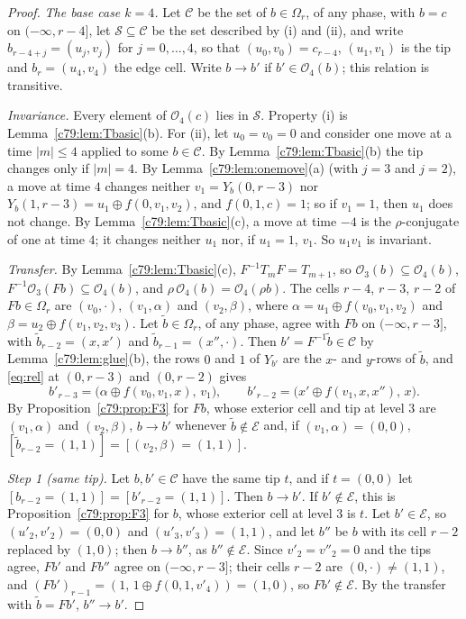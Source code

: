 \begin{proof}
\emph{The base case $k=4$.} Let $\mathcal C$ be the set of $b\in\Omega_r$, of any phase, with $b=c$ on $(-\infty,r-4]$, let $\mathcal S\subseteq\mathcal C$ be the set described by (i) and (ii), and write $b_{r-4+j}=(u_j,v_j)$ for $j=0,\dots,4$, so that $(u_0,v_0)=c_{r-4}$, $(u_1,v_1)$ is the tip and $b_r=(u_4,v_4)$ the edge cell. Write $b\to b'$ if $b'\in\mathcal O_4(b)$; this relation is transitive.

\emph{Invariance.} Every element of $\mathcal O_4(c)$ lies in $\mathcal S$. Property (i) is Lemma~\ref{c79:lem:Tbasic}(b). For (ii), let $u_0=v_0=0$ and consider one move at a time $|m|\le4$ applied to some $b\in\mathcal C$. By Lemma~\ref{c79:lem:Tbasic}(b) the tip changes only if $|m|=4$. By Lemma~\ref{c79:lem:onemove}(a) (with $j=3$ and $j=2$), a move at time $4$ changes neither $v_1=Y_b(0,r-3)$ nor $Y_b(1,r-3)=u_1\oplus f(0,v_1,v_2)$, and $f(0,1,c)=1$; so if $v_1=1$, then $u_1$ does not change. By Lemma~\ref{c79:lem:Tbasic}(c), a move at time $-4$ is the $\rho$-conjugate of one at time $4$; it changes neither $u_1$ nor, if $u_1=1$, $v_1$. So $u_1v_1$ is invariant.

\emph{Transfer.} By Lemma~\ref{c79:lem:Tbasic}(c), $F^{-1}T_mF=T_{m+1}$, so $\mathcal O_3(b)\subseteq\mathcal O_4(b)$, $F^{-1}\mathcal O_3(Fb)\subseteq\mathcal O_4(b)$, and $\rho\,\mathcal O_4(b)=\mathcal O_4(\rho b)$. The cells $r-4$, $r-3$, $r-2$ of $Fb\in\Omega_r$ are $(v_0,\cdot)$, $(v_1,\alpha)$ and $(v_2,\beta)$, where $\alpha=u_1\oplus f(v_0,v_1,v_2)$ and $\beta=u_2\oplus f(v_1,v_2,v_3)$. Let $\tilde b\in\Omega_r$, of any phase, agree with $Fb$ on $(-\infty,r-3]$, with $\tilde b_{r-2}=(x,x')$ and $\tilde b_{r-1}=(x'',\cdot)$. Then $b'=F^{-1}\tilde b\in\mathcal C$ by Lemma~\ref{c79:lem:glue}(b), the rows $0$ and $1$ of $Y_{b'}$ are the $x$- and $y$-rows of $\tilde b$, and \eqref{eq:rel} at $(0,r-3)$ and $(0,r-2)$ gives
\[
b'_{r-3}=\bigl(\alpha\oplus f(v_0,v_1,x),\,v_1\bigr),\qquad b'_{r-2}=\bigl(x'\oplus f(v_1,x,x''),\,x\bigr).
\]
By Proposition~\ref{c79:prop:F3} for $Fb$, whose exterior cell and tip at level $3$ are $(v_1,\alpha)$ and $(v_2,\beta)$, $b\to b'$ whenever $\tilde b\notin\mathcal E$ and, if $(v_1,\alpha)=(0,0)$, $[\tilde b_{r-2}=(1,1)]=[(v_2,\beta)=(1,1)]$.

\emph{Step 1 (same tip).} Let $b,b'\in\mathcal C$ have the same tip $t$, and if $t=(0,0)$ let $[b_{r-2}=(1,1)]=[b'_{r-2}=(1,1)]$. Then $b\to b'$. If $b'\notin\mathcal E$, this is Proposition~\ref{c79:prop:F3} for $b$, whose exterior cell at level $3$ is $t$. Let $b'\in\mathcal E$, so $(u'_2,v'_2)=(0,0)$ and $(u'_3,v'_3)=(1,1)$, and let $b''$ be $b$ with its cell $r-2$ replaced by $(1,0)$; then $b\to b''$, as $b''\notin\mathcal E$. Since $v'_2=v''_2=0$ and the tips agree, $Fb'$ and $Fb''$ agree on $(-\infty,r-3]$; their cells $r-2$ are $(0,\cdot)\ne(1,1)$, and $(Fb')_{r-1}=(1,\,1\oplus f(0,1,v'_4))=(1,0)$, so $Fb'\notin\mathcal E$. By the transfer with $\tilde b=Fb'$, $b''\to b'$.


\end{proof}
